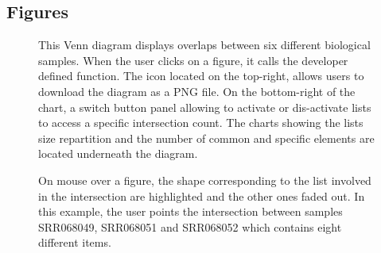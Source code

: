 \documentclass{bmcart}
\begin{document}
\begin{backmatter}

\section*{Figures}
  \begin{figure}[h!]
  \caption{
      This Venn diagram displays overlaps between six different biological
      samples. When the user clicks on a figure, it calls the developer defined
      function. The icon located on the top-right, allows users to download the
      diagram as a PNG file. On the bottom-right of the chart, a switch button
      panel allowing to activate or dis-activate lists to access a specific
      intersection count. The charts showing the lists size repartition and the
      number of common and specific elements are located underneath the
      diagram.}
      \end{figure}

\begin{figure}[h!]
  \caption{
      On mouse over a figure, the shape corresponding to the list involved in
      the intersection are highlighted and the other ones faded out. In
      this example, the user points the intersection between samples SRR068049,
      SRR068051 and SRR068052 which contains eight different items.}
      \end{figure}



\end{backmatter}
\end{document}
